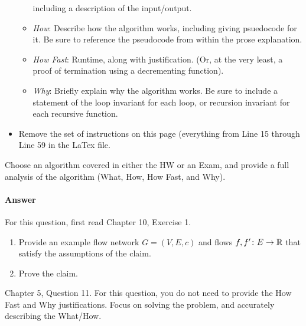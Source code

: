 \documentclass{article}
\begin{document}
\begin{itemize}
\begin{itemize}
                including a description of the input/output.
            \item \emph{How}: Describe how the algorithm works, including giving
                psuedocode for it.  Be sure to reference the pseudocode
                from within the prose explanation.
            \item \emph{How Fast}: Runtime, along with justification.  (Or, at
                the very least, a proof of termination using a decrementing function).
            \item \emph{Why}: Briefly explain why the algorithm works.  Be sure
                to include a statement of the loop invariant for each loop, or
                recursion invariant for each recursive function.
        \end{itemize}
    \item Remove the set of instructions on this page (everything from Line 15
        through Line 59 in the LaTex file.
\end{itemize}

\collab{\todo{}}

Choose an algorithm covered in either the HW or an Exam, and provide a full
analysis of the algorithm (What, How, How Fast, and Why).

\paragraph{Answer}
\todo{}

\collab{\todo{}}

For this question, first read Chapter 10, Exercise 1.

\begin{enumerate}
    \item Provide an example flow network $G=(V,E,c)$ and flows $f,f' \colon E
        \to {\mathbb R}$ that satisfy the assumptions of the claim.
    \item Prove the claim.
\end{enumerate}

\collab{\todo{}}

Chapter 5, Question 11.  For this question, you do not need to provide the How
Fast and Why justifications.  Focus on solving the problem, and accurately
describing the What/How.
\end{document}

